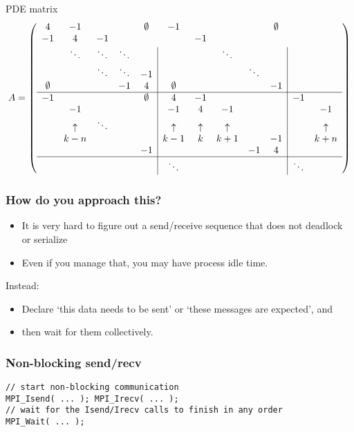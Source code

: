 \begin{frame}{PDE matrix}
  \footnotesize
  \[
    A=
    \left(\begin{array}{ccccc|ccccc|cc}
      4&-1&&&\emptyset&-1&&&&\emptyset&\\ 
      -1&4&-1&&&&-1&&&&\\ 
      &\ddots&\ddots&\ddots&&&&\ddots&&\\ 
      &&\ddots&\ddots&-1&&&&\ddots&\\ 
      \emptyset&&&-1&4&\emptyset&&&&-1&\\ \hline
      -1&&&&\emptyset&4&-1&&&&-1\\
      &-1      &      &&&-1      &4       &-1      &&&&-1\\
      &\uparrow&\ddots&&&\uparrow&\uparrow&\uparrow&&  &&\uparrow\\
      &k-n     &      &&&k-1     &k       &k+1     &&-1&&k+n\\
      &&&&-1&&&&-1&4&&\\ \hline
      &        &      &&&\ddots  &        &        &&  &\ddots\\
    \end{array}\right)
    \]
\end{frame}

\begin{frame}[containsverbatim]\frametitle{How do you approach this?}
  \begin{itemize}
  \item It is very hard to figure out a send/receive sequence that
    does not deadlock or serialize
  \item Even if you manage that, you may have process idle time.
  \end{itemize}
  Instead: 
  \begin{itemize}
  \item Declare `this data needs to be sent' or `these messages are expected', and
  \item then wait for them collectively.
  \end{itemize}
\end{frame}

\begin{frame}[containsverbatim]\frametitle{Non-blocking send/recv}
\lstset{language=C}
\begin{lstlisting}
// start non-blocking communication
MPI_Isend( ... ); MPI_Irecv( ... );
// wait for the Isend/Irecv calls to finish in any order
MPI_Wait( ... );  
\end{lstlisting}
\end{frame}

